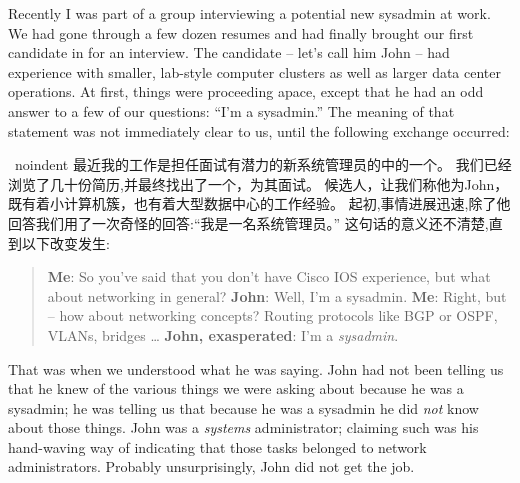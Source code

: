 



\noindent{}Recently I was part of a group interviewing a potential new sysadmin at
work. We had gone through a few dozen resumes and had finally brought our first
candidate in for an interview. The candidate -- let’s call him John -- had
experience with smaller, lab-style computer clusters as well as larger data
center operations. At first, things were proceeding apace, except that he had an
odd answer to a few of our questions: ``I’m a sysadmin.''
The meaning of that statement was not immediately clear to us, until the
following exchange occurred:

\ noindent { }最近我的工作是担任面试有潜力的新系统管理员的中的一个。
我们已经浏览了几十份简历,并最终找出了一个，为其面试。
候选人，让我们称他为John，既有着小计算机簇，也有着大型数据中心的工作经验。
起初,事情进展迅速,除了他回答我们用了一次奇怪的回答:“我是一名系统管理员。”
这句话的意义还不清楚,直到以下改变发生:

\begin{quote}
\textbf{Me}: So you’ve said that you don’t have Cisco IOS experience, but what about
networking in general?\newline
\textbf{John}: Well, I’m a sysadmin.\newline
\textbf{Me}: Right, but -- how about networking concepts? Routing protocols like BGP or
OSPF, VLANs, bridges \dots \newline
\textbf{John, exasperated}: I’m a \emph{sysadmin}.
\end{quote}
That was when we understood what he was saying. John had not been telling us that he knew
of the various things we were asking about because he was a sysadmin; he was
telling us that because he was a sysadmin he did \emph{not} know about those things.
John was a \emph{systems} administrator; claiming such was his hand-waving way of
indicating that those tasks belonged to network administrators.
Probably unsurprisingly, John did not get the job.

